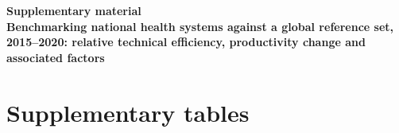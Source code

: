 \documentclass[11pt,letterpaper]{article}
\begin{document}
\begin{center}
{\large\bfseries Supplementary material}\\[6pt]
{\bfseries Benchmarking national health systems against a global reference set, 2015--2020: relative technical efficiency, productivity change and associated factors}
\end{center}

\tableofcontents

\clearpage
\section{Supplementary tables}
\end{document}
